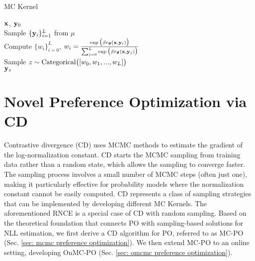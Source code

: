 
\begin{algorithm}[h]
\caption{MC Kernel}
\label{alg: contrastive divergence kernel}
\algorithmicinput \;\; $\mathbf{x}$, $\mathbf{y}_0$
\\
\algorithmicdo \;\; Sample $\{\mathbf{y}_i\}_{i=1}^{L}$ from $\mu$
\\
\algorithmicdo \;\; Compute $\{ w_i \}_{i=0}^{L}$,
\; $w_i = \frac{\exp 
\big(
\beta
r_{\boldsymbol\theta}(\mathbf{x}, \mathbf{y}_i)
\big)} {\sum_{j=0}^L \exp 
\big(
\beta
r_{\boldsymbol\theta}(\mathbf{x}, \mathbf{y}_j)
\big)}$
\\
\algorithmicdo \;\; Sample $z \sim {\rm Categorical}\big([w_0, w_1,...,w_{L}]\big)$
\\
\algorithmicoutput \;\; $\mathbf{y}_z$
\end{algorithm}

\section{Novel Preference Optimization via CD}
\label{sec: preference optimization via contrastive divergence}
Contrastive divergence (CD) uses MCMC methods to estimate the gradient of the log-normalization constant.
CD starts the MCMC sampling from training data rather than a random state, which allows the sampling to converge faster. 
The sampling process involves a small number of MCMC steps (often just one), making it particularly effective for probability models where the normalization constant cannot be easily computed.
CD represents a class of sampling strategies that can be implemented by developing different MC Kernels.
The aforementioned RNCE is a special case of CD with random sampling.
Based on the theoretical foundation that connects PO with sampling-based solutions for NLL estimation,
we first derive a CD algorithm for PO, referred to as MC-PO (Sec. \ref{sec: mcmc preference optimization}).
We then extend MC-PO to an online setting, developing OnMC-PO (Sec. \ref{sec: omcmc preference optimization}).


